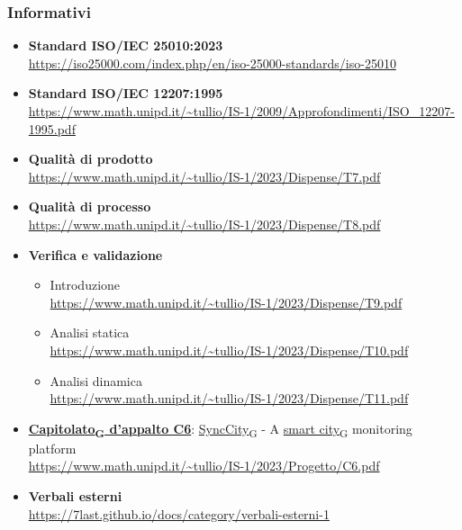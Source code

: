 \subsubsection{Informativi}
\begin{itemize}
    \item \textbf{Standard ISO/IEC 25010:2023} \\
        \url{https://iso25000.com/index.php/en/iso-25000-standards/iso-25010}
    \item \textbf{Standard ISO/IEC 12207:1995} \\
        \url{https://www.math.unipd.it/~tullio/IS-1/2009/Approfondimenti/ISO_12207-1995.pdf}
    \item \textbf{Qualità di prodotto} \\
        \url{https://www.math.unipd.it/~tullio/IS-1/2023/Dispense/T7.pdf}
    \item \textbf{Qualità di processo} \\
        \url{https://www.math.unipd.it/~tullio/IS-1/2023/Dispense/T8.pdf}
    \item \textbf{Verifica e validazione}
        \begin{itemize}
            \item Introduzione \\
                \url{https://www.math.unipd.it/~tullio/IS-1/2023/Dispense/T9.pdf}
            \item Analisi statica \\
                \url{https://www.math.unipd.it/~tullio/IS-1/2023/Dispense/T10.pdf}
            \item Analisi dinamica \\
                \url{https://www.math.unipd.it/~tullio/IS-1/2023/Dispense/T11.pdf}
        \end{itemize}
    \item \href{https://7last.github.io/docs/rtb/documentazione-interna/glossario\#capitolato}{\textbf{Capitolato\textsubscript{G} d'appalto C6}}: \href{https://7last.github.io/docs/rtb/documentazione-interna/glossario\#synccity}{SyncCity\textsubscript{G}} - A \href{https://7last.github.io/docs/rtb/documentazione-interna/glossario\#smart-city}{smart city\textsubscript{G}} monitoring platform \\
        \url{https://www.math.unipd.it/~tullio/IS-1/2023/Progetto/C6.pdf}
    \item \textbf{Verbali esterni} \\
        \url{https://7last.github.io/docs/category/verbali-esterni-1}

\end{itemize}
